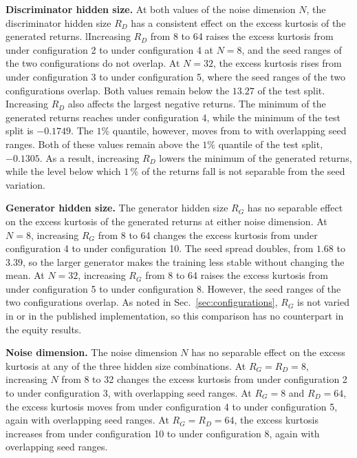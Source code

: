 \textbf{Discriminator hidden size.} At both values of the noise dimension $N$, the discriminator hidden size $R_D$ has a consistent effect on the excess kurtosis of the generated returns. lIncreasing $R_D$ from 8 to 64 raises the excess kurtosis from  under configuration 2 to  under configuration 4 at $N = 8$, and the seed ranges of the two configurations do not overlap. At $N=32$, the excess kurtosis rises from  under configuration 3 to  under configuration 5, where the seed ranges of the two configurations overlap. Both values remain below the $13.27$ of the test split. Increasing $R_D$ also affects the largest negative returns. The minimum of the generated returns reaches  under configuration 4, while the minimum of the test split is $-0.1749$. The $1\%$ quantile, however, moves from  to  with overlapping seed ranges. Both of these values remain above the $1\%$ quantile of the test split, $-0.1305$. As a result, increasing $R_D$ lowers the minimum of the generated returns, while the level below which $1\,\%$ of the returns fall is not separable from the seed variation.

\textbf{Generator hidden size.} The generator hidden size $R_G$ has no separable effect on the excess kurtosis of the generated returns at either noise dimension.
At $N=8$, increasing $R_G$ from 8 to 64 changes the excess kurtosis from  under configuration 4 to  under configuration 10. The seed spread doubles, from $1.68$ to $3.39$, so the larger generator makes the training less stable without changing the mean. At $N=32$, increasing $R_G$ from 8 to 64 raises the excess kurtosis from  under configuration 5 to  under configuration 8. However, the seed ranges of the two configurations overlap.
As noted in Sec.~\ref{sec:configurations}, $R_G$ is not varied in \textcite{vuleticFinGANForecastingClassifying2024} or in the published implementation, so this comparison has no counterpart in the equity results.

\textbf{Noise dimension.} The noise dimension $N$ has no separable effect on the excess kurtosis at any of the three hidden size combinations. At $R_G = R_D = 8$, increasing $N$ from 8 to 32 changes the excess kurtosis from  under configuration 2 to  under configuration 3, with overlapping seed ranges. At $R_G = 8$ and $R_D = 64$, the excess kurtosis moves from  under configuration 4 to  under configuration 5, again with overlapping seed ranges. At $R_G = R_D = 64$, the excess kurtosis increases from  under configuration 10 to  under configuration 8, again with overlapping seed ranges.

